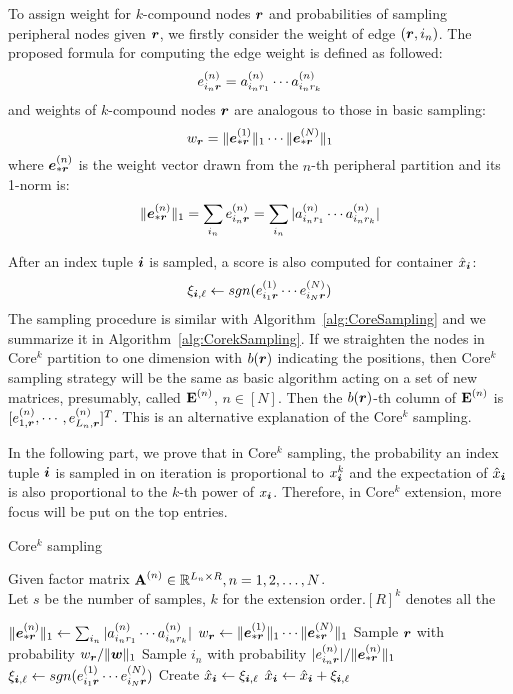 \documentclass[10pt,journal,compsoc]{IEEEtran}
\newcommand{\Sca}[3]{{#1}^{(#2)}_{i_#2#3}}%
\newcommand{\anr}[2]{\Sca{a}{#1}{#2}}
\newcommand{\enr}[2]{\Sca{e}{#1}{\V{#2}}}
\newcommand{\score}[1]{\xi_{\V{i},#1}}
\newcommand{\V}[1]{{\boldsymbol{{\MakeLowercase{#1}}}}}
\newcommand{\ColVec}[3]{\V{#1}^{(#2)}_{#3}}
\newcommand{\NormColE}[2]{\norm{\ColVec{e}{#1}{*\V{#2}}}{1}}
\newcommand{\coord}{(i_1,i_2,\ldots,i_N)}
\newcommand{\predx}{\hat{x}_{\V{i}}}
\newcommand{\M}[1]{{\textbf{{\MakeUppercase{#1}}}}}
\newcommand{\FacMat}[2]{\M{#1}^{(#2)}}
\newcommand{\norm}[2]{\|#1\|_{#2}}
\newcommand{\Alg}[1]{Algorithm~\ref{alg:#1}}
\begin{document}
To assign weight for $k$-compound nodes $\V{r}$ and probabilities of sampling peripheral nodes given $\V{r}$, we firstly consider the  weight of edge $(\V{r},i_n)$. The proposed formula for computing the edge weight is defined as followed:
\begin{equation}
\enr{n}{r} = \anr{n}{r_1}\cdots\anr{n}{r_k}
\end{equation}
and weights of $k$-compound nodes $\V{r}$ are analogous to those in basic sampling:
\begin{equation}
w_{\V{r}} = \NormColE{1}{r}\cdots\NormColE{N}{r}
\end{equation}
where $\V{e}_{*\V{r}}^{(n)}$ is the weight vector drawn from the $n$-th peripheral partition and its 1-norm is:
\begin{equation}
\NormColE{n}{r} = \sum_{i_n}\enr{n}{r}=\sum_{i_n}|\anr{n}{r_1}\cdots\anr{n}{r_k}|
\end{equation}

After an index tuple $\V{i}$ is sampled, a score is also computed for container $\predx$:
\begin{equation}
\score{\ell} \leftarrow sgn(\enr{1}{r}\cdots\enr{N}{r})
\end{equation}
The sampling procedure is similar with \Alg{CoreSampling} and we summarize it in \Alg{CorekSampling}. If we straighten the nodes in Core$^k$ partition to one dimension with $b(\V{r})$ indicating the positions, then Core$^k$ sampling strategy will be the same as basic algorithm acting on a set of new matrices, presumably, called $\M{E}^{(n)}$, $n\in[N]$. Then the $b(\V{r})$-th column of $\M{E}^{(n)}$ is $[e_{1,\V{r}}^{(n)},\cdots,e_{L_n,\V{r}}^{(n)}]^T$. This is an alternative explanation of the Core$^k$ sampling.

 In the following part, we prove that in Core$^k$ sampling, the probability an index tuple $\V{i}$ is sampled in on iteration is proportional to $x_{\V{i}}^k$ and the expectation of $\predx$ is also proportional to the $k$-th power of $x_{\V{i}}$. Therefore, in Core$^k$ extension, more focus will be put on the top entries.
\begin{algorithm}
	\caption{Core$^k$ sampling}
	\label{alg:CorekSampling}
	Given factor matrix $\FacMat{A}{n}\in \mathbb{R}^{L_n\times R}, n = 1,2,\ldots,N$.\\
	Let $s$ be the number of samples, $k$ for the extension order.$[R]^k$ denotes all the
	\begin{algorithmic}[1]
		\For{$\V{r}\in{\underbrace{[R]\times \cdots \times [R]}_{k}}$}
		\State $\NormColE{n}{r} \leftarrow \sum_{i_n}|\anr{n}{r_1}\cdots\anr{n}{r_k}|$
		\EndFor
		\State $w_{\V{r}} \leftarrow \NormColE{1}{r} \cdots \NormColE{N}{r} $
		\EndFor
		\State Sample $\V{r}$ with probability $w_\V{r}/\norm{\V{W}}{1}$
		\label{line:nodes}
		\State Sample $i_n$ with probability $|\enr{n}{r}|/\NormColE{n}{r}$
		\EndFor
		\State
		$\score{\ell} \leftarrow sgn(\enr{1}{r}\cdots\enr{N}{r})$
		\If {$\V{i}=\coord$ has not been sampled}
		\State  Create $\predx \leftarrow \score{\ell} $
		\Else
		\State $\predx \leftarrow \predx + \score{\ell}$
		\EndIf
		\EndFor
	\end{algorithmic}
\end{algorithm}
\end{document}
